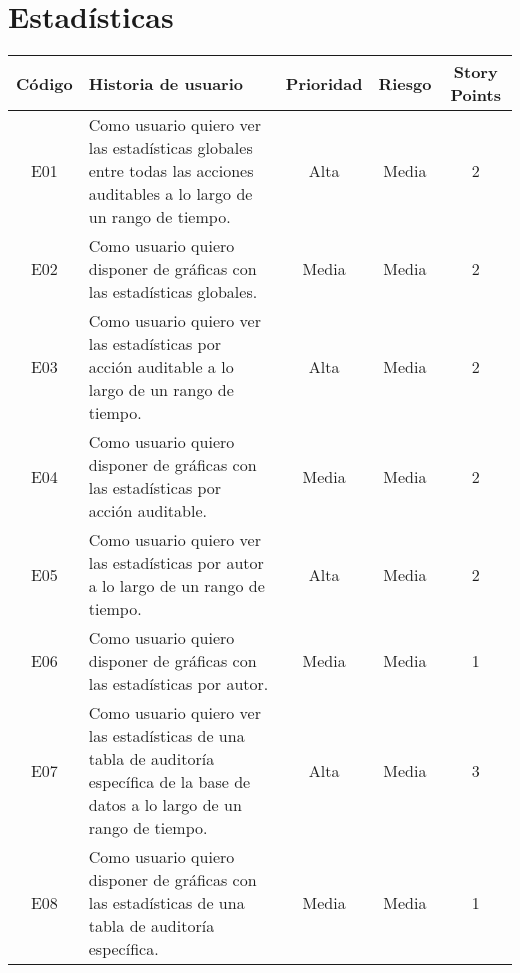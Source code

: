\section*{Estadísticas}

\begin{longtable}{| c | p{8cm} | c |c | c |}
\hline
Código & Historia de usuario                                                                                                                 & Prioridad & Riesgo & Story Points \\ \hline
E01    & Como usuario quiero ver las estadísticas globales entre todas las acciones auditables a lo largo de un rango de tiempo.             & Alta      & Media  & 2            \\ \hline
E02    & Como usuario quiero disponer de gráficas con las estadísticas globales.                                                             & Media     & Media  & 2            \\ \hline
E03    & Como usuario quiero ver las estadísticas por acción auditable a lo largo de un rango de tiempo.                                     & Alta      & Media  & 2            \\ \hline
E04    & Como usuario quiero disponer de gráficas con las estadísticas por acción auditable.                                                 & Media     & Media  & 2            \\ \hline
E05    & Como usuario quiero ver las estadísticas por autor a lo largo de un rango de tiempo.                                                & Alta      & Media  & 2            \\ \hline
E06    & Como usuario quiero disponer de gráficas con las estadísticas por autor.                                                            & Media     & Media  & 1            \\ \hline
E07    & Como usuario quiero ver las estadísticas de una tabla de auditoría específica de la base de datos a lo largo de un rango de tiempo. & Alta      & Media  & 3            \\ \hline
E08    & Como usuario quiero disponer de gráficas con las estadísticas de una tabla de auditoría específica.                                 & Media     & Media  & 1            \\ \hline
\end{longtable}
